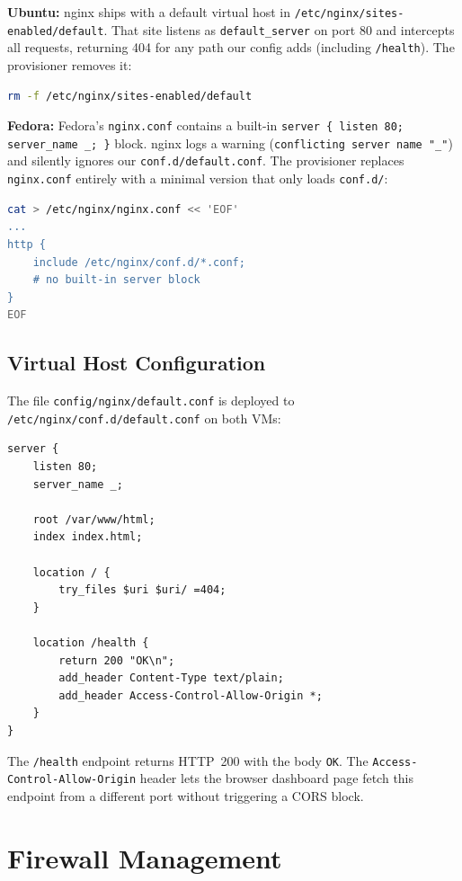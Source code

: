 \documentclass[11pt,a4paper]{article}
\begin{document}
\textbf{Ubuntu:} nginx ships with a default virtual host in \texttt{/etc/nginx/sites-enabled/default}. That site listens as \texttt{default\_server} on port 80 and intercepts all requests, returning 404 for any path our config adds (including \texttt{/health}). The provisioner removes it:

\begin{lstlisting}[language=bash]
rm -f /etc/nginx/sites-enabled/default
\end{lstlisting}

\textbf{Fedora:} Fedora's \texttt{nginx.conf} contains a built-in \texttt{server \{ listen 80; server\_name \_; \}} block. nginx logs a warning (\texttt{conflicting server name "\_"}) and silently ignores our \texttt{conf.d/default.conf}. The provisioner replaces \texttt{nginx.conf} entirely with a minimal version that only loads \texttt{conf.d/}:

\begin{lstlisting}[language=bash]
cat > /etc/nginx/nginx.conf << 'EOF'
...
http {
    include /etc/nginx/conf.d/*.conf;
    # no built-in server block
}
EOF
\end{lstlisting}

\subsection{Virtual Host Configuration}

The file \texttt{config/nginx/default.conf} is deployed to \texttt{/etc/nginx/conf.d/default.conf} on both VMs:

\begin{lstlisting}[caption={config/nginx/default.conf}]
server {
    listen 80;
    server_name _;

    root /var/www/html;
    index index.html;

    location / {
        try_files $uri $uri/ =404;
    }

    location /health {
        return 200 "OK\n";
        add_header Content-Type text/plain;
        add_header Access-Control-Allow-Origin *;
    }
}
\end{lstlisting}

The \texttt{/health} endpoint returns HTTP~200 with the body \texttt{OK}. The \texttt{Access-Control-Allow-Origin} header lets the browser dashboard page fetch this endpoint from a different port without triggering a CORS block.

\section{Firewall Management}
\label{sec:firewall}
\end{document}
